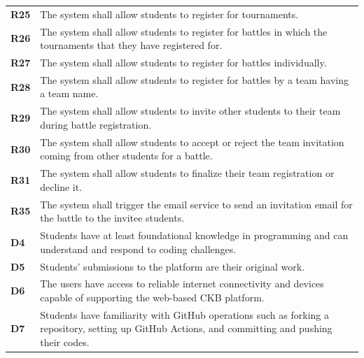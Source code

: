 \begin{table}[h!]
\begin{tabular}{lp{15cm}}
\textbf{R25} &  The system shall allow students to register for tournaments.\\
\textbf{R26} &  The system shall allow students to register for battles in which the tournaments that they have registered for.\\
\textbf{R27} &  The system shall allow students to register for battles individually.\\
\textbf{R28} &  The system shall allow students to register for battles by a team having a team name.\\
\textbf{R29} &  The system shall allow students to invite other students to their team during battle registration.\\
\textbf{R30} &  The system shall allow students to accept or reject the team invitation coming from other students for a battle.\\
\textbf{R31} &  The system shall allow students to finalize their team registration or decline it.\\

\textbf{R35} & The system shall trigger the email service to send an invitation email for the battle to the invitee students. \\
    
    \hline
    \hline
    \textbf{D4} & Students have at least foundational knowledge in programming and can understand and respond to coding challenges.\\
    \textbf{D5} & Students’ submissions to the platform are their original work. \\
    \textbf{D6} & The users have access to reliable internet connectivity and devices capable of supporting the web-based CKB platform. \\
    \textbf{D7} & Students have familiarity with GitHub operations such as forking a repository, setting up GitHub Actions, and committing and pushing their codes.\\
    \hline
  \end{tabular}
\end{table}



\newpage



